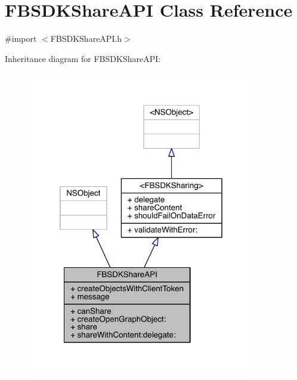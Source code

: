 \hypertarget{interface_f_b_s_d_k_share_a_p_i}{\section{F\-B\-S\-D\-K\-Share\-A\-P\-I Class Reference}
\label{interface_f_b_s_d_k_share_a_p_i}
}


{\ttfamily \#import $<$F\-B\-S\-D\-K\-Share\-A\-P\-I.\-h$>$}



Inheritance diagram for F\-B\-S\-D\-K\-Share\-A\-P\-I\-:
\nopagebreak
\begin{figure}[H]
\begin{center}
\leavevmode
\includegraphics[width=283pt]{interface_f_b_s_d_k_share_a_p_i__inherit__graph}
\end{center}
\end{figure}


